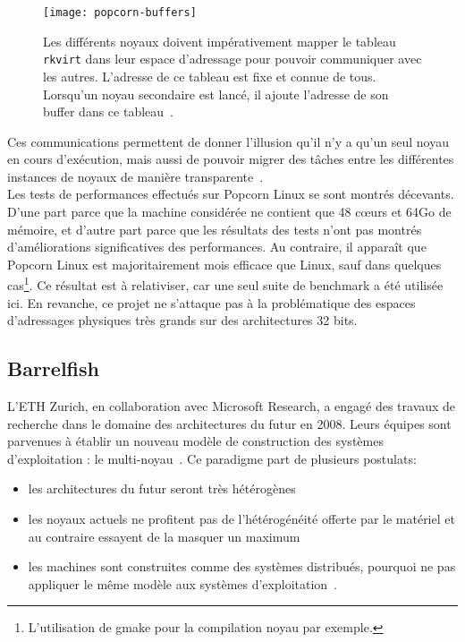       \begin{figure}[ht]
        \centering
        \texttt{[image: popcorn-buffers]}
        \caption{Les différents noyaux doivent impérativement mapper le tableau
          \texttt{rkvirt} dans leur espace d'adressage pour pouvoir communiquer
          avec les autres. L'adresse de ce tableau est fixe et connue de tous.
          Lorsqu'un noyau secondaire est lancé, il ajoute l'adresse de son
          buffer dans ce tableau~\citep{barbalacepopcorn}.}
        \label{fig:popcorn-buf}
      \end{figure}

      Ces communications permettent de donner l’illusion qu’il n’y a qu’un seul
      noyau en cours d’exécution, mais aussi de pouvoir migrer des tâches entre
      les différentes instances de noyaux de manière
      transparente~\citep{katz2013popcorn}.\\

      Les tests de performances effectués sur Popcorn Linux se sont montrés
      décevants. D'une part parce que la machine considérée ne contient que 48
      c\oe urs et 64Go de mémoire, et d'autre part parce que les résultats des
      tests n'ont pas montrés d'améliorations significatives des
      performances. Au contraire, il apparaît que Popcorn Linux est
      majoritairement mois efficace que Linux, sauf dans quelques
      cas\footnote{L'utilisation de gmake pour la compilation noyau par
        exemple.}. Ce résultat est à relativiser, car une seul suite de
      benchmark a été utilisée ici. En revanche, ce projet ne s'attaque pas à la
      problématique des espaces d'adressages physiques très grands sur des
      architectures 32 bits.


    \subsection{Barrelfish}
      
      L’ETH Zurich, en collaboration avec Microsoft Research, a engagé des
      travaux de recherche dans le domaine des architectures du futur en
      2008. Leurs équipes sont parvenues à établir un nouveau modèle de
      construction des systèmes d’exploitation : le
      multi-noyau~\citep{baumann2009multikernel}. Ce paradigme part de plusieurs
      postulats:
      \begin{itemize}
        \item les architectures du futur seront très
          hétérogènes~\citep{schupbach2008embracing}
        \item les noyaux actuels ne profitent pas de l’hétérogénéité offerte par
          le matériel et au contraire essayent de la masquer un maximum
        \item les machines sont construites comme des systèmes distribués,
          pourquoi ne pas appliquer le même modèle aux systèmes
          d’exploitation~\citep{baumann2009your}.\\
      \end{itemize}

